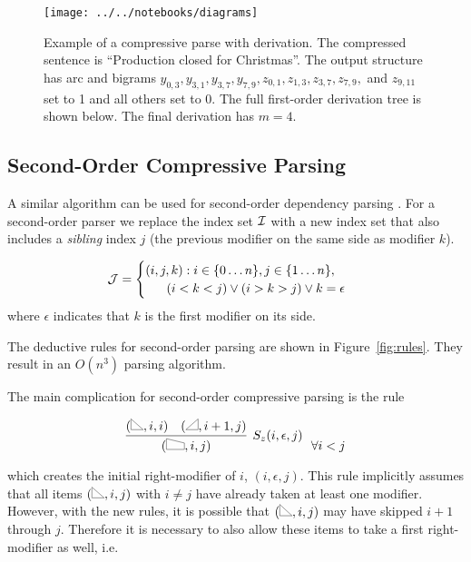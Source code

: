 \documentclass[11pt]{article}
\newcommand{\NULL}{\ensuremath{\epsilon}}
\newcommand{\Enum}[1]{\{1 \ldots #1\}}
\newcommand{\EnumS}[2]{\{#1 \ldots #2\}}
\newcommand{\IndexSet}{{\cal I}}
\newcommand{\IndexSetB}{{\cal J}}
\newcommand{\rtrap}{\scalebox{0.2}{\tikz{
    \coordinate (A) at (0,0);
    \coordinate (B) at (90:1.5cm);
    \coordinate (C) at (2.5,0.9cm);
    \coordinate (D) at (0:2.5cm);
    \draw[line width = 0.05cm] (A)--(B)--(C)--(D)--cycle;
    }}}
\newcommand{\rtri}{\scalebox{0.2}{\tikz{
    \coordinate (A) at (0,0);
    \coordinate (B) at (90:1.5cm);
    \coordinate (C) at (180:-1.7cm);
    \draw[line width = 0.05cm] (A)--(B)--(C)--cycle;
    }}}
\newcommand{\ltri}{\scalebox{0.2}{\tikz{
    \coordinate (A) at (0,0);
    \coordinate (B) at (90:1.5cm);
    \coordinate (C) at (180:1.7cm);
    \draw[line width = 0.05cm] (A)--(B)--(C)--cycle;
    }}}
\begin{document}


\begin{figure*}
  \centering
  \texttt{[image: ../../notebooks/diagrams]}
  \label{fig:parse}
  \caption{Example of a compressive parse with derivation. The compressed sentence is ``Production closed for Christmas''. The output structure has arc and bigrams $y_{0,3}, y_{3,1},y_{3,7},y_{7,9},z_{0,1},z_{1,3},z_{3,7}, z_{7,9},$ and $z_{9,11}$ set to 1 and all others set to 0. The full first-order derivation tree is shown below. The final derivation has $m=4$. }
\end{figure*}


\subsection{Second-Order Compressive Parsing}

A similar algorithm can be used for second-order dependency parsing \cite{}. For a second-order parser
we replace the index set $\IndexSet$ with a new index set that also includes a \textit{sibling}
index $j$ (the previous modifier on the same side as modifier $k$). 

\[ \IndexSetB=  \begin{cases} (i,j,k) : 
    i \in \EnumS{0}{n}, j \in \Enum{n}, \\
    \ \ \ \ \  (i < k < j) \lor (i >k  > j) \lor k = \NULL
  \end{cases} \ \]
\noindent where $\NULL$ indicates that $k$ is the first modifier on its side. 

The deductive rules for second-order parsing are shown in
Figure~\ref{fig:rules}. They result in an $O(n^3)$ parsing algorithm.

The main complication for second-order compressive parsing is the rule 

\[  \infer[S_z(i,\epsilon,j)]{(\rtrap, i,j)}{(\rtri, i,i)  &  (\ltri, i+1, j) } \ \  \forall i < j\]

\noindent which creates the initial right-modifier of $i$, $(i, \NULL, j)$. This rule
implicitly assumes that all items $(\rtri, i, j)$ with $i\neq j$ have
already taken at least one modifier. However, with the new rules, it is possible 
that $(\rtri, i, j)$ may have skipped $i+1$ through $j$. Therefore it is necessary 
to also allow these items to take a first right-modifier as well, i.e.
\end{document}
